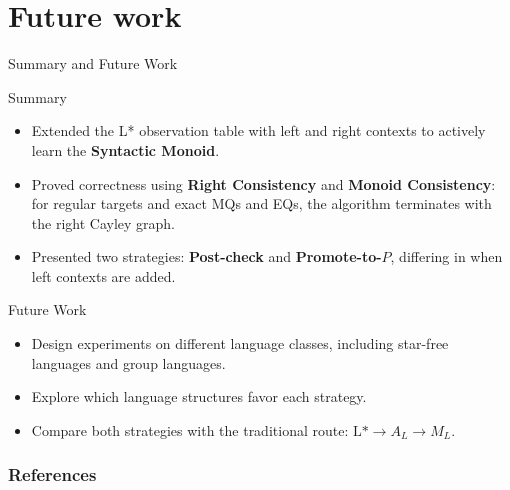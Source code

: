 \documentclass{beamer}
\begin{document}
\section{Future work}

\begin{frame}{Summary and Future Work}
    \begin{block}{Summary}
        \begin{itemize}
            \item Extended the L* observation table with left and right
            contexts to actively learn the \textbf{Syntactic Monoid}.
            \item Proved correctness using \textbf{Right Consistency} and
            \textbf{Monoid Consistency}: for regular targets and exact MQs
            and EQs, the algorithm terminates with the right Cayley graph.
            \item Presented two strategies: \textbf{Post-check} and
            \textbf{Promote-to-$P$}, differing in when left contexts are added.
        \end{itemize}
    \end{block}

    \begin{block}{Future Work}
        \begin{itemize}
            \item Design experiments on different language classes,
            including star-free languages and group languages.
            \item Explore which language structures favor each strategy.
            \item Compare both strategies with the traditional route:
            $\text{L*}\to A_L\to M_L$.
        \end{itemize}
    \end{block}
\end{frame}

\begin{frame}[allowframebreaks] 
    \frametitle{References}
    
    
     
\end{frame}
\end{document}
